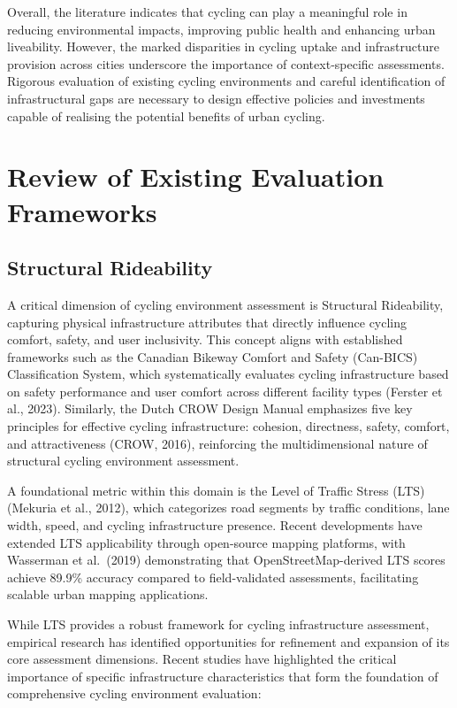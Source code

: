 \documentclass[
  12pt,
  oneside]{book}
\begin{document}
Overall, the literature indicates that cycling can play a meaningful role in reducing environmental impacts, improving public health and enhancing urban liveability. However, the marked disparities in cycling uptake and infrastructure provision across cities underscore the importance of context‑specific assessments. Rigorous evaluation of existing cycling environments and careful identification of infrastructural gaps are necessary to design effective policies and investments capable of realising the potential benefits of urban cycling.

\section{Review of Existing Evaluation Frameworks}\label{review-of-existing-evaluation-frameworks}

\subsection{Structural Rideability}\label{structural-rideability}

A critical dimension of cycling environment assessment is Structural Rideability, capturing physical infrastructure attributes that directly influence cycling comfort, safety, and user inclusivity. This concept aligns with established frameworks such as the Canadian Bikeway Comfort and Safety (Can-BICS) Classification System, which systematically evaluates cycling infrastructure based on safety performance and user comfort across different facility types (Ferster et al., 2023). Similarly, the Dutch CROW Design Manual emphasizes five key principles for effective cycling infrastructure: cohesion, directness, safety, comfort, and attractiveness (CROW, 2016), reinforcing the multidimensional nature of structural cycling environment assessment.

A foundational metric within this domain is the Level of Traffic Stress (LTS) (Mekuria et al., 2012), which categorizes road segments by traffic conditions, lane width, speed, and cycling infrastructure presence. Recent developments have extended LTS applicability through open-source mapping platforms, with Wasserman et al.~(2019) demonstrating that OpenStreetMap-derived LTS scores achieve 89.9\% accuracy compared to field-validated assessments, facilitating scalable urban mapping applications.

While LTS provides a robust framework for cycling infrastructure assessment, empirical research has identified opportunities for refinement and expansion of its core assessment dimensions. Recent studies have highlighted the critical importance of specific infrastructure characteristics that form the foundation of comprehensive cycling environment evaluation:
\end{document}
